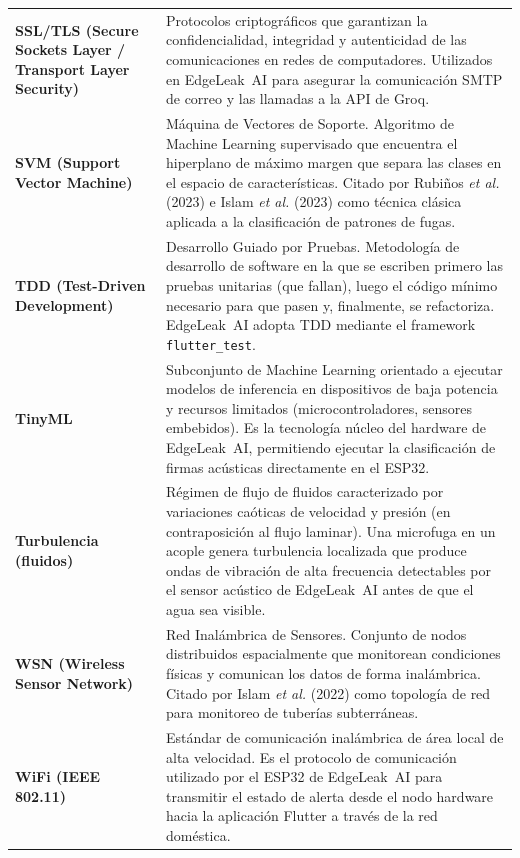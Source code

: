 \documentclass[12pt,a4paper]{article}
\begin{document}
\begin{longtable}{>{\bfseries}p{3.8cm} p{10.5cm}}
SSL/TLS (Secure Sockets Layer / Transport Layer Security) & Protocolos criptográficos
que garantizan la confidencialidad, integridad y autenticidad de las comunicaciones en
redes de computadores. Utilizados en EdgeLeak~AI para asegurar la comunicación SMTP de
correo y las llamadas a la API de Groq.
\\[0.5em]

SVM (Support Vector Machine) & Máquina de Vectores de Soporte. Algoritmo de Machine
Learning supervisado que encuentra el hiperplano de máximo margen que separa las clases
en el espacio de características. Citado por Rubiños \textit{et al.} (2023) e Islam
\textit{et al.} (2023) como técnica clásica aplicada a la clasificación de patrones de
fugas.
\\[0.5em]

TDD (Test-Driven Development) & Desarrollo Guiado por Pruebas. Metodología de desarrollo
de software en la que se escriben primero las pruebas unitarias (que fallan), luego el
código mínimo necesario para que pasen y, finalmente, se refactoriza. EdgeLeak~AI adopta
TDD mediante el framework \texttt{flutter\_test}.
\\[0.5em]

TinyML & Subconjunto de Machine Learning orientado a ejecutar modelos de inferencia en
dispositivos de baja potencia y recursos limitados (microcontroladores, sensores
embebidos). Es la tecnología núcleo del hardware de EdgeLeak~AI, permitiendo ejecutar
la clasificación de firmas acústicas directamente en el ESP32.
\\[0.5em]

Turbulencia (fluidos) & Régimen de flujo de fluidos caracterizado por variaciones
caóticas de velocidad y presión (en contraposición al flujo laminar). Una microfuga
en un acople genera turbulencia localizada que produce ondas de vibración de alta
frecuencia detectables por el sensor acústico de EdgeLeak~AI antes de que el agua
sea visible.
\\[0.5em]

WSN (Wireless Sensor Network) & Red Inalámbrica de Sensores. Conjunto de nodos
distribuidos espacialmente que monitorean condiciones físicas y comunican los datos
de forma inalámbrica. Citado por Islam \textit{et al.} (2022) como topología de red
para monitoreo de tuberías subterráneas.
\\[0.5em]

WiFi (IEEE 802.11) & Estándar de comunicación inalámbrica de área local de alta
velocidad. Es el protocolo de comunicación utilizado por el ESP32 de EdgeLeak~AI para
transmitir el estado de alerta desde el nodo hardware hacia la aplicación Flutter a
través de la red doméstica.
\\[0.5em]


\end{longtable}
\end{document}
